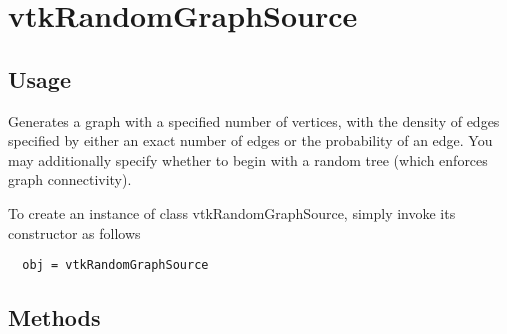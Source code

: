\section{vtkRandomGraphSource}

\subsection{Usage}

 Generates a graph with a specified number of vertices, with the density of
 edges specified by either an exact number of edges or the probability of
 an edge.  You may additionally specify whether to begin with a random
 tree (which enforces graph connectivity).


To create an instance of class vtkRandomGraphSource, simply
invoke its constructor as follows
\begin{verbatim}
  obj = vtkRandomGraphSource
\end{verbatim}
\subsection{Methods}

